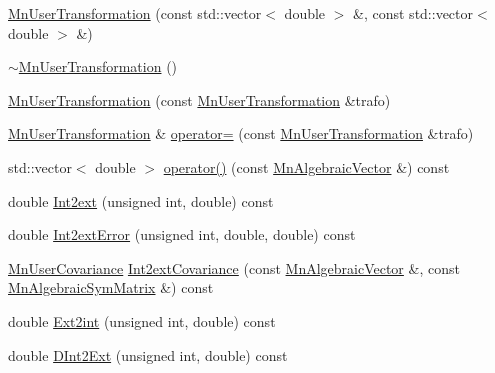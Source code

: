 \begin{DoxyCompactItemize}
\item 
\mbox{\hyperlink{classROOT_1_1Minuit2_1_1MnUserTransformation_a75c58c9381f8c42adcee7319d2671918}{Mn\+User\+Transformation}} (const std\+::vector$<$ double $>$ \&, const std\+::vector$<$ double $>$ \&)
\item 
\mbox{\hyperlink{classROOT_1_1Minuit2_1_1MnUserTransformation_a1510c72a07c9d089f16a4536ceacde56}{$\sim$\+Mn\+User\+Transformation}} ()
\item 
\mbox{\hyperlink{classROOT_1_1Minuit2_1_1MnUserTransformation_ae2bba4ce251f0eab8719900620addef9}{Mn\+User\+Transformation}} (const \mbox{\hyperlink{classROOT_1_1Minuit2_1_1MnUserTransformation}{Mn\+User\+Transformation}} \&trafo)
\item 
\mbox{\hyperlink{classROOT_1_1Minuit2_1_1MnUserTransformation}{Mn\+User\+Transformation}} \& \mbox{\hyperlink{classROOT_1_1Minuit2_1_1MnUserTransformation_a54aa66bb6edb8264484b6ece788b903c}{operator=}} (const \mbox{\hyperlink{classROOT_1_1Minuit2_1_1MnUserTransformation}{Mn\+User\+Transformation}} \&trafo)
\item 
std\+::vector$<$ double $>$ \mbox{\hyperlink{classROOT_1_1Minuit2_1_1MnUserTransformation_ae5f766bba2c9c99bf009e8799afc5348}{operator()}} (const \mbox{\hyperlink{namespaceROOT_1_1Minuit2_a62ed97730a1ca8d3fbaec64a19aa11c9}{Mn\+Algebraic\+Vector}} \&) const
\item 
double \mbox{\hyperlink{classROOT_1_1Minuit2_1_1MnUserTransformation_aa05e327d2e4376c0e1db865ba92becdd}{Int2ext}} (unsigned int, double) const
\item 
double \mbox{\hyperlink{classROOT_1_1Minuit2_1_1MnUserTransformation_ad900f367f4d2c5df13f899dd55bdf212}{Int2ext\+Error}} (unsigned int, double, double) const
\item 
\mbox{\hyperlink{classROOT_1_1Minuit2_1_1MnUserCovariance}{Mn\+User\+Covariance}} \mbox{\hyperlink{classROOT_1_1Minuit2_1_1MnUserTransformation_a10f2146be0a2c991243dd2f70a943a15}{Int2ext\+Covariance}} (const \mbox{\hyperlink{namespaceROOT_1_1Minuit2_a62ed97730a1ca8d3fbaec64a19aa11c9}{Mn\+Algebraic\+Vector}} \&, const \mbox{\hyperlink{namespaceROOT_1_1Minuit2_a9e74ad97f5537a2e80e52b04d98ecc6e}{Mn\+Algebraic\+Sym\+Matrix}} \&) const
\item 
double \mbox{\hyperlink{classROOT_1_1Minuit2_1_1MnUserTransformation_a0296bec1f14bc7ee514527b88aff0760}{Ext2int}} (unsigned int, double) const
\item 
double \mbox{\hyperlink{classROOT_1_1Minuit2_1_1MnUserTransformation_a35938acd16a546d398ce1c00ffc98c44}{D\+Int2\+Ext}} (unsigned int, double) const

\end{DoxyCompactItemize}
